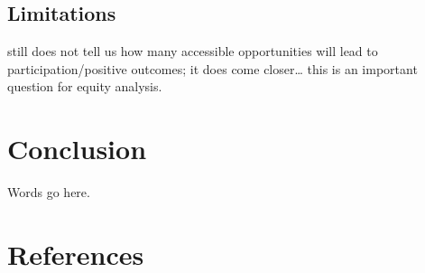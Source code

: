 \documentclass[]{elsarticle} %
\begin{document}
\hypertarget{limitations}{%
\subsection{Limitations}\label{limitations}}

still does not tell us how many accessible opportunities will lead to
participation/positive outcomes; it does come closer\ldots{} this is an
important question for equity analysis.

\hypertarget{conclusion}{%
\section{Conclusion}\label{conclusion}}

Words go here.

\hypertarget{references}{%
\section*{References}\label{references}}
\end{document}
